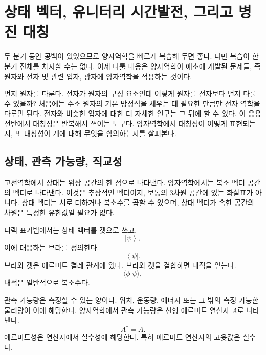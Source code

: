 \chapter{상태 벡터, 유니터리 시간발전, 그리고 병진 대칭}
\providecommand{\ket}[1]{\left\lvert#1\right\rangle}
\providecommand{\bra}[1]{\left\langle#1\right\rvert}

두 분기 동안 공백이 있었으므로 양자역학을 빠르게 복습해 두면 좋다. 다만 복습이 한 분기 전체를 차지할 수는 없다. 이제 다룰 내용은 양자역학이 애초에 개발된 문제들, 즉 원자와 전자 및 관련 입자, 광자에 양자역학을 적용하는 것이다.

먼저 원자를 다룬다. 전자가 원자의 구성 요소인데 어떻게 원자를 전자보다 먼저 다룰 수 있을까? 처음에는 수소 원자의 기본 방정식을 세우는 데 필요한 만큼만 전자 역학을 다루면 된다. 전자와 비슷한 입자에 대한 더 자세한 연구는 그 뒤에 할 수 있다. 이 응용 전반에서 대칭성은 반복해서 쓰이는 도구다. 양자역학에서 대칭성이 어떻게 표현되는지, 또 대칭성이 계에 대해 무엇을 함의하는지를 살펴본다.

\section{상태, 관측 가능량, 직교성}

고전역학에서 상태는 위상 공간의 한 점으로 나타낸다. 양자역학에서는 복소 벡터 공간의 벡터로 나타낸다. 이것은 추상적인 벡터이지, 보통의 3차원 공간에 있는 화살표가 아니다. 상태 벡터는 서로 더하거나 복소수를 곱할 수 있으며, 상태 벡터가 속한 공간의 차원은 특정한 유한값일 필요가 없다.

디랙 표기법에서는 상태 벡터를 켓으로 쓰고,
\begin{equation}
\ket{\psi},
\end{equation}
이에 대응하는 브라를 정의한다.
\begin{equation}
\bra{\psi}.
\end{equation}
브라와 켓은 에르미트 켤레 관계에 있다. 브라와 켓을 결합하면 내적을 얻는다.
\begin{equation}
\langle\phi|\psi\rangle,
\end{equation}
내적은 일반적으로 복소수다.

관측 가능량은 측정할 수 있는 양이다. 위치, 운동량, 에너지 또는 그 밖의 측정 가능한 물리량이 이에 해당한다. 양자역학에서 관측 가능량은 선형 에르미트 연산자 \(A\)로 나타낸다.
\begin{equation}
A^\dagger=A.
\end{equation}
에르미트성은 연산자에서 실수성에 해당한다. 특히 에르미트 연산자의 고윳값은 실수다.

